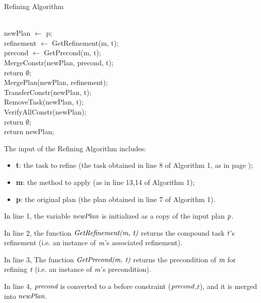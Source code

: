 \begin{algorithm}[H] 
\caption{Refining Algorithm} 
\\[0.2cm]
newPlan $\leftarrow$ p;\\
refinement $\leftarrow$ GetRefinement(m, t);\\
precond $\leftarrow$ GetPrecond(m, t);\\[0.2cm]

MergeConstr(newPlan, precond, t);\\
 {
    return $\emptyset$;
}\\[0.2cm]

MergePlan(newPlan, refinement);\\
TransferConstr(newPlan, t);\\
RemoveTask(newPlan, t);\\[0.2cm]

VerifyAllConstr(newPlan);\\
 {
    return $\emptyset$;
}\\[0.2cm]

return newPlan;
\end{algorithm}

The input of the Refining Algorithm includes:
\begin{itemize}
\item[] \textbf{t}: the task to refine (the task obtained in line 8 of Algorithm 1, as in page \pageref{algo1});
\item[] \textbf{m}: the method to apply (as in line 13,14 of Algorithm 1);
\item[] \textbf{p}: the original plan (the plan obtained in line 7 of Algorithm 1).
\end{itemize}

In line 1, the variable $\emph{newPlan}$ is initialized as a copy of the input plan $\emph{p}$. 

In line 2, the function $\emph{GetRefinement(m, t)}$ returns the compound task $\emph{t}$’s refinement (i.e. an instance of $\emph{m}$’s associated refinement).

In line 3, The function $\emph{GetPrecond(m, t)}$ returns the precondition of $\emph{m}$ for refining $\emph{t}$ (i.e. an instance of $\emph{m}$’s precondition). 

In line 4, $\emph{precond}$ is converted to a before constraint ($\emph{precond}$,$\emph{t}$), and it is merged into $\emph{newPlan}$.

